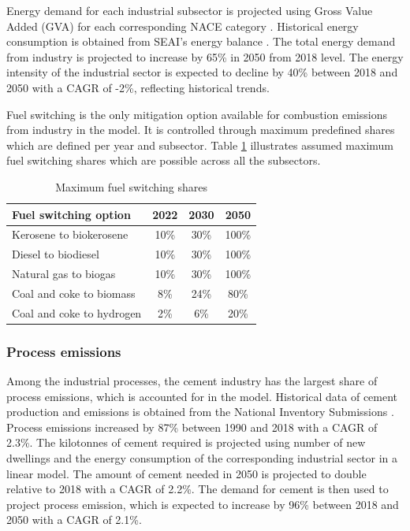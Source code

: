 \documentclass[journal abbreviation, manuscript]{copernicus}
\begin{document}
Energy demand for each industrial subsector is projected using Gross Value Added (GVA) for each corresponding NACE category \citep{Yakut2020}. Historical energy consumption is obtained from SEAI's energy balance \citep{SEAI2019}. The total energy demand from industry is projected to increase by 65\% in 2050 from 2018 level. The energy intensity of the industrial sector is expected to decline by 40\% between 2018 and 2050 with a CAGR of -2\%, reflecting historical trends. 

Fuel switching is the only mitigation option available for combustion emissions from industry in the model. It is controlled through maximum predefined shares which are defined per year and subsector. Table \ref{Maximum fuel switching share in Industry} illustrates assumed maximum fuel switching shares which are possible across all the subsectors. 

\begin{table}[htbp]
\footnotesize
 \centering
 \caption{Maximum fuel switching shares}
 \begin{tabular}{lccc}
 \hline
 Fuel switching option & 2022 & 2030 & 2050 \\
 \hline
 Kerosene to biokerosene & 10\% & 30\% & 100\% \\
 Diesel to biodiesel & 10\% & 30\% & 100\% \\
 Natural gas to biogas & 10\% & 30\% & 100\% \\ 
 Coal and coke to biomass & 8\% & 24\% & 80\% \\ 
 Coal and coke to hydrogen & 2\% & 6\% & 20\% \\ \hline
 \end{tabular}%
 \label{Maximum fuel switching share in Industry}%
\end{table}%

\subsubsection{Process emissions}
Among the industrial processes, the cement industry has the largest share of process emissions, which is accounted for in the model. Historical data of cement production and emissions is obtained from the National Inventory Submissions \citep{NIR2020E91:online}. Process emissions increased by 87\% between 1990 and 2018 with a CAGR of 2.3\%. The kilotonnes of cement required is projected using number of new dwellings and the energy consumption of the corresponding industrial sector in a linear model. The amount of cement needed in 2050 is projected to double relative to 2018 with a CAGR of 2.2\%. The demand for cement is then used to project process emission, which is expected to increase by 96\% between 2018 and 2050 with a CAGR of 2.1\%. 
\end{document}
